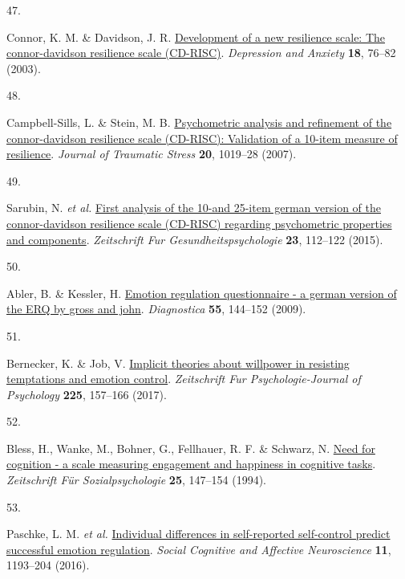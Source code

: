 \documentclass[
  man,floatsintext]{apa6}
\newlength{\cslhangindent}
\newlength{\csllabelwidth}
\newlength{\cslentryspacingunit} %
\newenvironment{CSLReferences}[2] %
 {%
  \setlength{\parindent}{0pt}
  \ifodd #1
  \let\oldpar\par
  \def\par{\hangindent=\cslhangindent\oldpar}
  \fi
  \setlength{\parskip}{#2\cslentryspacingunit}
 }%
 {}
\newcommand{\CSLLeftMargin}[1]{\parbox[t]{\csllabelwidth}{#1}}
\newcommand{\CSLRightInline}[1]{\parbox[t]{\linewidth - \csllabelwidth}{#1}\break}
\begin{document}
\begin{CSLReferences}{0}{0}
\leavevmode{}%
\CSLLeftMargin{47. }%
\CSLRightInline{Connor, K. M. \& Davidson, J. R. \href{https://doi.org/10.1002/da.10113}{Development of a new resilience scale: The connor-davidson resilience scale (CD-RISC)}. \emph{Depression and Anxiety} \textbf{18}, 76--82 (2003).}

\leavevmode{}%
\CSLLeftMargin{48. }%
\CSLRightInline{Campbell-Sills, L. \& Stein, M. B. \href{https://doi.org/10.1002/jts.20271}{Psychometric analysis and refinement of the connor-davidson resilience scale (CD-RISC): Validation of a 10-item measure of resilience}. \emph{Journal of Traumatic Stress} \textbf{20}, 1019--28 (2007).}

\leavevmode{}%
\CSLLeftMargin{49. }%
\CSLRightInline{Sarubin, N. \emph{et al.} \href{https://doi.org/10.1026/0943-8149/a000142}{First analysis of the 10-and 25-item german version of the connor-davidson resilience scale (CD-RISC) regarding psychometric properties and components}. \emph{Zeitschrift Fur Gesundheitspsychologie} \textbf{23}, 112--122 (2015).}

\leavevmode{}%
\CSLLeftMargin{50. }%
\CSLRightInline{Abler, B. \& Kessler, H. \href{https://doi.org/10.1026/0012-1924.55.3.144}{Emotion regulation questionnaire - a german version of the ERQ by gross and john}. \emph{Diagnostica} \textbf{55}, 144--152 (2009).}

\leavevmode{}%
\CSLLeftMargin{51. }%
\CSLRightInline{Bernecker, K. \& Job, V. \href{https://doi.org/10.1027/2151-2604/a000292}{Implicit theories about willpower in resisting temptations and emotion control}. \emph{Zeitschrift Fur Psychologie-Journal of Psychology} \textbf{225}, 157--166 (2017).}

\leavevmode{}%
\CSLLeftMargin{52. }%
\CSLRightInline{Bless, H., Wanke, M., Bohner, G., Fellhauer, R. F. \& Schwarz, N. \href{\%3CGo\%20to\%20ISI\%3E://WOS:A1994NR83900004}{Need for cognition - a scale measuring engagement and happiness in cognitive tasks}. \emph{Zeitschrift Für Sozialpsychologie} \textbf{25}, 147--154 (1994).}

\leavevmode{}%
\CSLLeftMargin{53. }%
\CSLRightInline{Paschke, L. M. \emph{et al.} \href{https://doi.org/10.1093/scan/nsw036}{Individual differences in self-reported self-control predict successful emotion regulation}. \emph{Social Cognitive and Affective Neuroscience} \textbf{11}, 1193--204 (2016).}


\end{CSLReferences}
\end{document}
